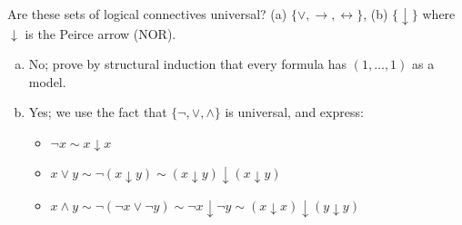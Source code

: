 \begin{problem} 
    
    Are these sets of logical connectives universal? (a) $\{\vee, \rightarrow, \leftrightarrow\}$, (b) $\{\downarrow\}$ where $\downarrow$ is the Peirce arrow (NOR).    

    \begin{solution}
        \begin{enumerate}[(a)]
            \item No; prove by structural induction that every formula has $(1,\dots,1)$ as a model. 
            \item Yes; we use the fact that $\{\neg,\lor,\land\}$ is universal, and express:
            \begin{itemize}
                \item $\neg x\sim x\downarrow x$
                \item $x\lor y\sim\neg(x\downarrow y)\sim (x\downarrow y)\downarrow(x\downarrow y)$
                \item $x\land y\sim \neg(\neg x\lor \neg y)\sim \neg x\downarrow\neg y\sim (x\downarrow x)\downarrow(y\downarrow y)$
            \end{itemize}
        \end{enumerate}            
    \end{solution}

\end{problem}


